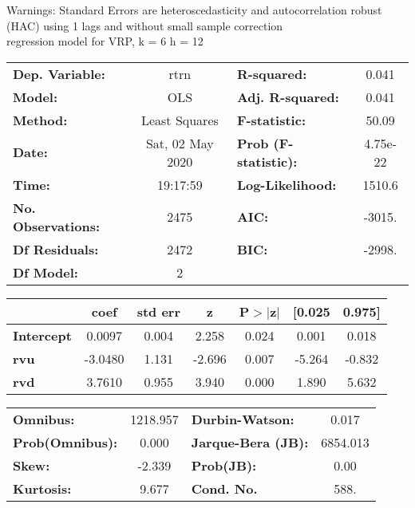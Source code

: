 Warnings: \newline
 [1] Standard Errors are heteroscedasticity and autocorrelation robust (HAC) using 1 lags and without small sample correction\\ 

regression model for VRP, k = 6 h = 12\begin{center}
\begin{tabular}{lclc}
\toprule
\textbf{Dep. Variable:}    &       rtrn       & \textbf{  R-squared:         } &     0.041   \\
\textbf{Model:}            &       OLS        & \textbf{  Adj. R-squared:    } &     0.041   \\
\textbf{Method:}           &  Least Squares   & \textbf{  F-statistic:       } &     50.09   \\
\textbf{Date:}             & Sat, 02 May 2020 & \textbf{  Prob (F-statistic):} &  4.75e-22   \\
\textbf{Time:}             &     19:17:59     & \textbf{  Log-Likelihood:    } &    1510.6   \\
\textbf{No. Observations:} &        2475      & \textbf{  AIC:               } &    -3015.   \\
\textbf{Df Residuals:}     &        2472      & \textbf{  BIC:               } &    -2998.   \\
\textbf{Df Model:}         &           2      & \textbf{                     } &             \\
\bottomrule
\end{tabular}
\begin{tabular}{lcccccc}
                   & \textbf{coef} & \textbf{std err} & \textbf{z} & \textbf{P$> |$z$|$} & \textbf{[0.025} & \textbf{0.975]}  \\
\midrule
\textbf{Intercept} &       0.0097  &        0.004     &     2.258  &         0.024        &        0.001    &        0.018     \\
\textbf{rvu}       &      -3.0480  &        1.131     &    -2.696  &         0.007        &       -5.264    &       -0.832     \\
\textbf{rvd}       &       3.7610  &        0.955     &     3.940  &         0.000        &        1.890    &        5.632     \\
\bottomrule
\end{tabular}
\begin{tabular}{lclc}
\textbf{Omnibus:}       & 1218.957 & \textbf{  Durbin-Watson:     } &    0.017  \\
\textbf{Prob(Omnibus):} &   0.000  & \textbf{  Jarque-Bera (JB):  } & 6854.013  \\
\textbf{Skew:}          &  -2.339  & \textbf{  Prob(JB):          } &     0.00  \\
\textbf{Kurtosis:}      &   9.677  & \textbf{  Cond. No.          } &     588.  \\
\bottomrule
\end{tabular}
\end{center}

